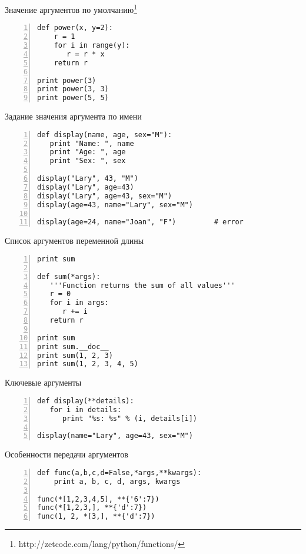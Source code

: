 \documentclass[hyperref={pdftex,unicode}]{beamer}
\begin{document}
\begin{frame}[fragile]{Значение аргументов по умолчанию\footnote[frame]{
      http://zetcode.com/lang/python/functions/
}}
  \begin{lstlisting}[numbers=left]
def power(x, y=2):
    r = 1
    for i in range(y):
       r = r * x
    return r

print power(3)
print power(3, 3)
print power(5, 5)
  \end{lstlisting}
\end{frame}

\begin{frame}[fragile]{Задание значения аргумента по имени}
  \begin{lstlisting}[numbers=left]
def display(name, age, sex="M"):
   print "Name: ", name
   print "Age: ", age
   print "Sex: ", sex

display("Lary", 43, "M")
display("Lary", age=43)
display("Lary", age=43, sex="M")
display(age=43, name="Lary", sex="M")

display(age=24, name="Joan", "F")         # error
\end{lstlisting}
\end{frame}

\begin{frame}[fragile]{Список аргументов переменной длины}
  \begin{lstlisting}[numbers=left]
print sum

def sum(*args):
   '''Function returns the sum of all values'''
   r = 0
   for i in args:
      r += i
   return r

print sum
print sum.__doc__
print sum(1, 2, 3)
print sum(1, 2, 3, 4, 5)
  \end{lstlisting}
\end{frame}

\begin{frame}[fragile]{Ключевые аргументы}
  \begin{lstlisting}[numbers=left]
def display(**details):
   for i in details:
      print "%s: %s" % (i, details[i])

display(name="Lary", age=43, sex="M")
  \end{lstlisting}
\end{frame}

\begin{frame}[fragile]{Особенности передачи аргументов}
  \begin{lstlisting}[numbers=left]
def func(a,b,c,d=False,*args,**kwargs):
    print a, b, c, d, args, kwargs

func(*[1,2,3,4,5], **{'6':7})
func(*[1,2,3,], **{'d':7})
func(1, 2, *[3,], **{'d':7})
  \end{lstlisting}
\end{frame}
\end{document}
